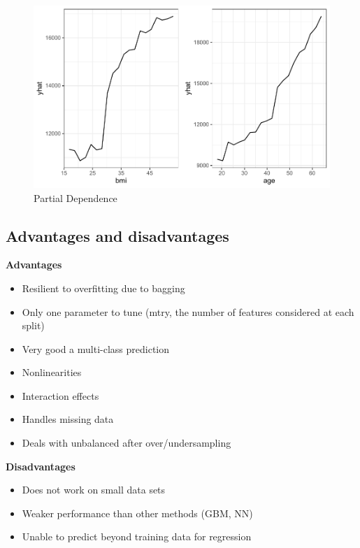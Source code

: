 \documentclass[
  openany]{book}
\providecommand{\tightlist}{%
  \setlength{\itemsep}{0pt}\setlength{\parskip}{0pt}}
\begin{document}
\begin{figure}
\centering
\includegraphics{06-tree-based-models_files/figure-latex/unnamed-chunk-19-1.pdf}
\caption{\label{fig:unnamed-chunk-19}Partial Dependence}
\end{figure}

\hypertarget{advantages-and-disadvantages-3}{%
\subsection{Advantages and disadvantages}\label{advantages-and-disadvantages-3}}

\textbf{Advantages}

\begin{itemize}
\tightlist
\item
  Resilient to overfitting due to bagging
\item
  Only one parameter to tune (mtry, the number of features considered at each split)
\item
  Very good a multi-class prediction
\item
  Nonlinearities
\item
  Interaction effects
\item
  Handles missing data
\item
  Deals with unbalanced after over/undersampling
\end{itemize}

\textbf{Disadvantages}

\begin{itemize}
\tightlist
\item
  Does not work on small data sets
\item
  Weaker performance than other methods (GBM, NN)
\item
  Unable to predict beyond training data for regression
\end{itemize}
\end{document}
